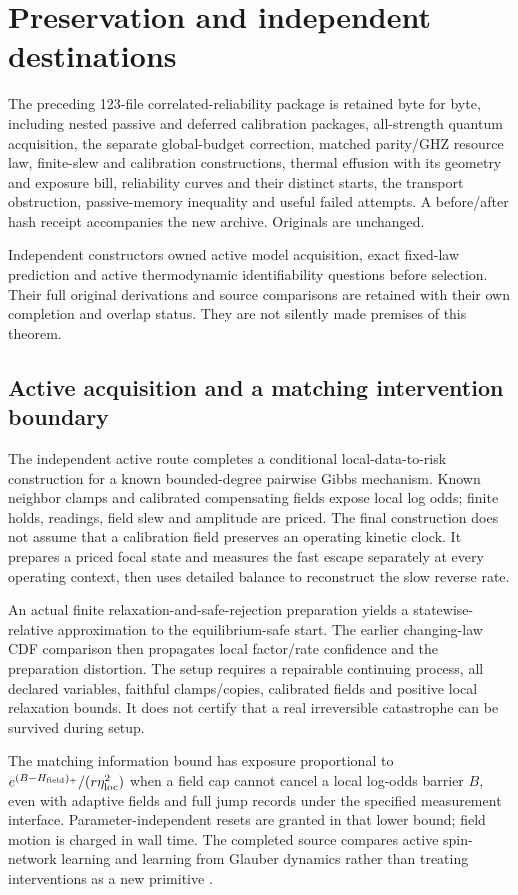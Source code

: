 

\section{Preservation and independent destinations}
The preceding 123-file correlated-reliability package is retained byte for byte, including nested passive and deferred calibration packages, all-strength quantum acquisition, the separate global-budget correction, matched parity/GHZ resource law, finite-slew and calibration constructions, thermal effusion with its geometry and exposure bill, reliability curves and their distinct starts, the transport obstruction, passive-memory inequality and useful failed attempts. A before/after hash receipt accompanies the new archive. Originals are unchanged.

Independent constructors owned active model acquisition, exact fixed-law prediction and active thermodynamic identifiability questions before selection. Their full original derivations and source comparisons are retained with their own completion and overlap status. They are not silently made premises of this theorem.

\subsection{Active acquisition and a matching intervention boundary}
The independent active route completes a conditional local-data-to-risk
construction for a known bounded-degree pairwise Gibbs mechanism. Known
neighbor clamps and calibrated compensating fields expose local log odds;
finite holds, readings, field slew and amplitude are priced. The final
construction does not assume that a calibration field preserves an
operating kinetic clock. It prepares a priced focal state and measures the
fast escape separately at every operating context, then uses detailed
balance to reconstruct the slow reverse rate.

An actual finite relaxation-and-safe-rejection preparation yields a
statewise-relative approximation to the equilibrium-safe start. The
earlier changing-law CDF comparison then propagates local factor/rate
confidence and the preparation distortion. The setup requires a repairable
continuing process, all declared variables, faithful clamps/copies,
calibrated fields and positive local relaxation bounds. It does not certify
that a real irreversible catastrophe can be survived during setup.

The matching information bound has exposure proportional to
$e^{(B-H_{\rm field})_+}/(r\eta_{\rm loc}^2)$ when a field cap cannot cancel
a local log-odds barrier $B$, even with adaptive fields and full jump records
under the specified measurement interface. Parameter-independent resets are
granted in that lower bound; field motion is charged in wall time.
The completed source compares active spin-network learning and learning
from Glauber dynamics rather than treating interventions as a new primitive
\cite{jiang,dutt}.


